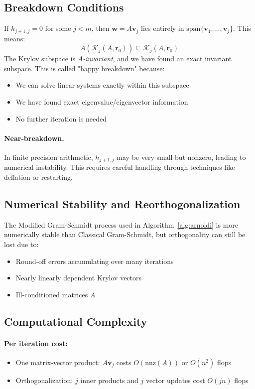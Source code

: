 \subsection{Breakdown Conditions}
If $h_{j+1,j} = 0$ for some $j < m$, then $\mathbf{w} = A\mathbf{v}_j$ lies entirely in $\text{span}\{\mathbf{v}_1, \ldots, \mathbf{v}_j\}$. This means:
\[
  A(\mathcal{K}_j(A,\mathbf{r}_0)) \subseteq \mathcal{K}_j(A,\mathbf{r}_0)
\]
The Krylov subspace is \emph{$A$-invariant}, and we have found an exact invariant subspace. This is called "happy breakdown" because:
\begin{itemize}
  \item We can solve linear systems exactly within this subspace
  \item We have found exact eigenvalue/eigenvector information
  \item No further iteration is needed
\end{itemize}

\paragraph{Near-breakdown.}
In finite precision arithmetic, $h_{j+1,j}$ may be very small but nonzero, leading to numerical instability. This requires careful handling through techniques like deflation or restarting.

\subsection{Numerical Stability and Reorthogonalization}
The Modified Gram-Schmidt process used in Algorithm~\ref{alg:arnoldi} is more numerically stable than Classical Gram-Schmidt, but orthogonality can still be lost due to:
\begin{itemize}
  \item Round-off errors accumulating over many iterations
  \item Nearly linearly dependent Krylov vectors
  \item Ill-conditioned matrices $A$
\end{itemize}

\subsection{Computational Complexity}

\paragraph{Per iteration cost:}
\begin{itemize}
  \item One matrix-vector product: $A\mathbf{v}_j$ costs $O(\text{nnz}(A))$ or $O(n^2)$ flops
  \item Orthogonalization: $j$ inner products and $j$ vector updates cost $O(jn)$ flops
\end{itemize}

